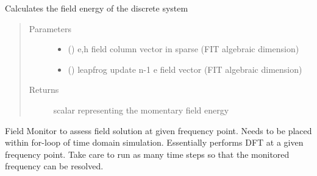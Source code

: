 \documentclass[letterpaper,10pt,english]{sphinxmanual}
\begin{document}
\begin{fulllineitems}

\begin{fulllineitems}
\label{\detokenize{FIT:FIT.FIT.fieldEnergy}}
Calculates the field energy of the discrete system
\begin{quote}\begin{description}
\item[{Parameters}] \leavevmode\begin{itemize}
\item {} 
\sphinxstyleliteralstrong{\sphinxupquote{,}} () \textendash{} e,h field column vector in sparse (FIT algebraic dimension)

\item {} 
 () \textendash{} leapfrog update n-1 e field vector (FIT algebraic dimension)

\end{itemize}

\item[{Returns}] \leavevmode
scalar representing the momentary field energy

\end{description}\end{quote}

\end{fulllineitems}


\begin{fulllineitems}
\label{\detokenize{FIT:FIT.FIT.fieldMonitor}}
Field Monitor to assess field solution at given frequency point. Needs to be placed within for-loop of time domain simulation. Essentially performs DFT at a given frequency point. Take care to run as many time steps so that the monitored frequency can be resolved.


\end{fulllineitems}
\end{fulllineitems}
\end{document}
